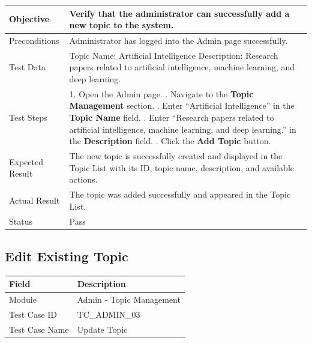 \documentclass[12pt,a4paper]{article}
\begin{document}
{{\begin{longtable}{|p{4cm}|p{10cm}|}
	Objective &
	Verify that the administrator can successfully add a new topic to the system. \\ \hline
	
	Preconditions &
	Administrator has logged into the Admin page successfully. \\ \hline
	
	Test Data &
	Topic Name: Artificial Intelligence \newline
	Description: Research papers related to artificial intelligence, machine learning, and deep learning.
	\\ \hline
	
	Test Steps &
	1. Open the Admin page. \newline
	2. Navigate to the \textbf{Topic Management} section. \newline
	3. Enter ``Artificial Intelligence'' in the \textbf{Topic Name} field. \newline
	4. Enter ``Research papers related to artificial intelligence, machine learning, and deep learning.'' in the \textbf{Description} field. \newline
	5. Click the \textbf{Add Topic} button.
	\\ \hline
	
	Expected Result &
	The new topic is successfully created and displayed in the Topic List with its ID, topic name, description, and available actions. \\ \hline
	
	Actual Result &
	The topic was added successfully and appeared in the Topic List. \\ \hline
	
	Status & Pass \\ \hline
	
\end{longtable}
\subsection{Edit Existing Topic}
\begin{longtable}{|p{4cm}|p{10cm}|}
	\hline
	\textbf{Field} & \textbf{Description} \\ \hline
	
	Module & Admin - Topic Management \\ \hline
	
	Test Case ID & TC\_ADMIN\_03 \\ \hline
	
	Test Case Name & Update Topic \\ \hline
	

\end{longtable}}}
\end{document}
